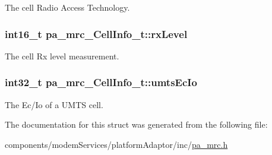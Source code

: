 The cell Radio Access Technology. 

\subsubsection[{\texorpdfstring{rx\+Level}{rxLevel}}]{\setlength{\rightskip}{0pt plus 5cm}int16\+\_\+t pa\+\_\+mrc\+\_\+\+Cell\+Info\+\_\+t\+::rx\+Level}\hypertarget{structpa__mrc___cell_info__t_a126363d808190c8f784ec7ae87940745}{}\label{structpa__mrc___cell_info__t_a126363d808190c8f784ec7ae87940745}


The cell Rx level measurement. 

\subsubsection[{\texorpdfstring{umts\+Ec\+Io}{umtsEcIo}}]{\setlength{\rightskip}{0pt plus 5cm}int32\+\_\+t pa\+\_\+mrc\+\_\+\+Cell\+Info\+\_\+t\+::umts\+Ec\+Io}\hypertarget{structpa__mrc___cell_info__t_a31d5e4e6ee7c60466c08c01dfb485095}{}\label{structpa__mrc___cell_info__t_a31d5e4e6ee7c60466c08c01dfb485095}


The Ec/\+Io of a U\+M\+TS cell. 



The documentation for this struct was generated from the following file\+:\begin{DoxyCompactItemize}
\item 
components/modem\+Services/platform\+Adaptor/inc/\hyperlink{pa__mrc_8h}{pa\+\_\+mrc.\+h}\end{DoxyCompactItemize}
